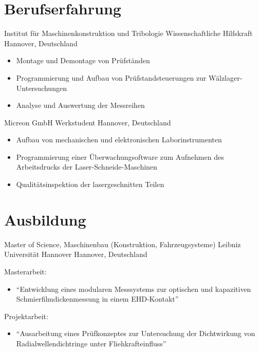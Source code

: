 \documentclass[11pt,a4paper,sans]{moderncv}
\begin{document}
\section{\textbf{Berufserfahrung}}

{Institut für Maschinenkonstruktion und Tribologie}
{Wissenschaftliche Hilfskraft}
{Hannover, Deutschland}
{}
{
    \begin{itemize}
        \item Montage und Demontage von Prüfständen
        \item Programmierung und Aufbau von Prüfstandsteuerungen zur Wälzlager-Untersuchungen
        \item Analyse und Auswertung der Messreihen
    \end{itemize}
}

{Micreon GmbH}
{Werkstudent}
{Hannover, Deutschland}
{}
{
    \begin{itemize}
        \item Aufbau von mechanischen und elektronischen Laborinstrumenten
        \item Programmierung einer Überwachungsoftware zum Aufnehmen des Arbeitsdrucks der Laser-Schneide-Maschinen
        \item Qualitätsinspektion der lasergeschnitten Teilen
    \end{itemize}
}



\section{\textbf{Ausbildung}}

{Master of Science, Maschinenbau (Konstruktion, Fahrzeugsysteme)}
{Leibniz Universität Hannover}
{Hannover, Deutschland}
{}
{
    Masterarbeit:
    \begin{itemize}
        \item ``Entwicklung eines modularen Messsystems zur optischen und kapazitiven Schmierfilmdickenmessung in einem EHD-Kontakt''
    \end{itemize}
    Projektarbeit:
    \begin{itemize}
        \item "`Ausarbeitung eines Prüfkonzeptes zur Untersuchung der Dichtwirkung von Radialwellendichtringe unter Fliehkrafteinfluss"'
    \end{itemize}
}
\end{document}
